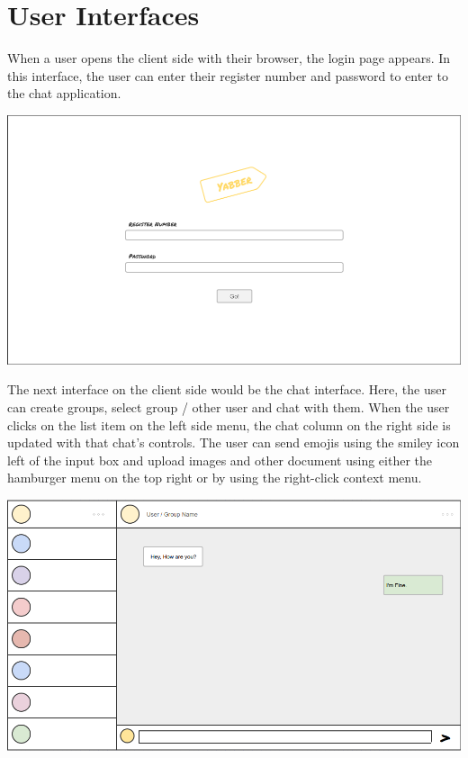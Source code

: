\documentclass{scrreprt}
\begin{document}
\section{User Interfaces}
When a user opens the client side with their browser, the login page appears.
In this interface, the user can enter their register number and password
to enter to the chat application.

\begin{center}
\includegraphics[scale=.29]{login}
\end{center}

The next interface on the client side would be the chat interface. Here, the
user can create groups, select group / other user and chat with them. When the
user clicks on the list item on the left side menu, the chat column on the right
side is updated with that chat's controls. The user can send emojis using the smiley
icon left of the input box and upload images and other document using either the
hamburger menu on the top right or by using the right-click context menu.

\begin{center}
\includegraphics[scale=.3]{chat}
\end{center}
\end{document}
